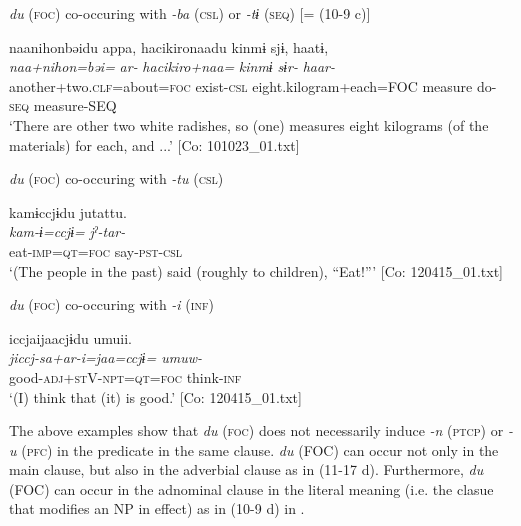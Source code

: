   \ex \textit{du} (\textsc{foc}) co-occuring with \textit{{}-ba} (\textsc{csl}) or \textit{-tɨ} (\textsc{seq}) [= (10-9 c)]

  
      \glll    naa{\textbar}nihon{\textbar}bəidu  appa,  {\textbar}hacikiro{\textbar}naadu kinmɨ  sjɨ,  haatɨ,\\
    \textit{naa+nihon=bəi=}  \textit{ar-}  \textit{hacikiro+naa=}  \textit{kinmɨ}  \textit{sɨr-}  \textit{haar-}\\
    another+two.\textsc{clf}=about=\textsc{foc}  exist-\textsc{csl}  eight.kilogram+each=FOC  measure  do-\textsc{seq}  measure-SEQ\\
    ‘There are other two white radishes, so (one) measures eight kilograms (of the materials) for each, and ...’    [Co: 101023\_01.txt]

  \ex \textit{du} (\textsc{foc}) co-occuring with \textit{{}-tu} (\textsc{csl})

  
      \glll    kamɨccjɨdu  jutattu.\\
    \textit{kam-ɨ=ccjɨ=}  \textit{jˀ-tar-}\\
    eat-\textsc{imp}=\textsc{qt}=\textsc{foc}  say-\textsc{pst}-\textsc{csl}\\
\glt     ‘(The people in the past) said (roughly to children), “Eat!”’ [Co: 120415\_01.txt]

  \ex \textit{du} (\textsc{foc}) co-occuring with \textit{{}-i} (\textsc{inf})

  
      \glll    iccjaijaacjɨdu  umuii.\\
    \textit{jiccj}\footnotemark[2]{}\textit{{}-sa+ar-i=jaa=ccjɨ=  umuw-}\\
    good-\textsc{adj}+\textsc{st}V-\textsc{npt}=\textsc{qt}=\textsc{foc}  think-\textsc{inf}\\
    \glt     ‘(I) think that (it) is good.’ [Co: 120415\_01.txt]
\z
\z
{}

The above examples show that \textit{du} (\textsc{foc}) does not necessarily induce \textit{{}-n} (\textsc{ptcp}) or \textit{{}-u} (\textsc{pfc}) in the predicate in the same clause. \textit{du} (FOC) can occur not only in the main clause, but also in the adverbial clause as in (11-17 d). Furthermore, \textit{du} (FOC) can occur in the adnominal clause in the literal meaning (i.e. the clasue that modifies an NP in effect) as in (10-9 d) in .

